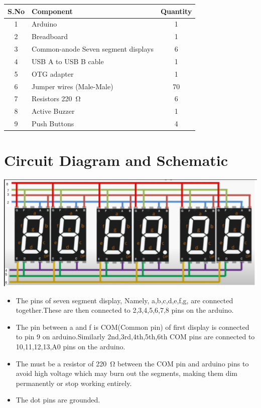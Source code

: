 \documentclass[journal]{IEEEtran}
\begin{document}
\begin{table}[h]
    \centering
    \renewcommand{\arraystretch}{1.2}
    \begin{tabular}{|c|l|c|}
        \hline
        \textbf{S.No} & \textbf{Component} & \textbf{Quantity} \\
        \hline
         1& Arduino  & 1 \\
         2& Breadboard & 1 \\
         3& Common-anode Seven segment displays & 6  \\
         4& USB A to USB B cable & 1 \\
         5& OTG adapter & 1 \\
         6& Jumper wires (Male-Male)& 70 \\
         7& Resistors \SI{220}{\ohm} & 6 \\
         8& Active Buzzer &1 \\
         9& Push Buttons &4\\
        \hline
    \end{tabular}
\end{table}

\section{Circuit Diagram and Schematic}

\begin{center}
    \includegraphics[width=0.75\columnwidth]{Connections/Connections.png}
\end{center}
\begin{itemize}
    \item The pins of seven segment display, Namely, a,b,c,d,e,f,g, are connected together.These are then connected to 2,3,4,5,6,7,8 pins on the arduino.
    \item The pin between a and f is COM(Common pin) of first display is connected to pin 9 on arduino.Similarly 2nd,3rd,4th,5th,6th COM pins are connected to 10,11,12,13,A0 pins on the arduino.
    \item The must be a resistor of \SI{220}{\ohm} between the COM pin and arduino pins to avoid high voltage which may  burn out the segments, making them dim permanently or stop working entirely.
    \item The dot pins are grounded.
\end{itemize}
\end{document}
